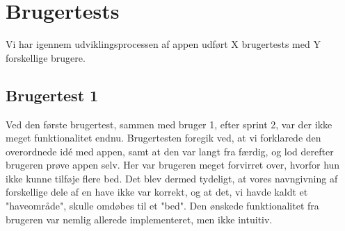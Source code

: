 \section{Brugertests}
Vi har igennem udviklingsprocessen af appen udført X brugertests med Y forskellige brugere.

\subsection{Brugertest 1}
Ved den første brugertest, sammen med bruger 1, efter sprint 2, var der ikke meget funktionalitet endnu. Brugertesten foregik ved, at vi forklarede den overordnede idé med appen, samt at den var langt fra færdig, og lod derefter brugeren prøve appen selv. Her var brugeren meget forvirret over, hvorfor hun ikke kunne tilføje flere bed. Det blev dermed tydeligt, at vores navngivning af forskellige dele af en have ikke var korrekt, og at det, vi havde kaldt et "haveområde", skulle omdøbes til et "bed". Den ønskede funktionalitet fra brugeren var nemlig allerede implementeret, men ikke intuitiv.